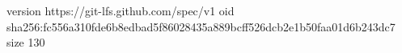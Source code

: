 version https://git-lfs.github.com/spec/v1
oid sha256:fc556a310fde6b8edbad5f86028435a889bcff526dcb2e1b50faa01d6b243dc7
size 130
